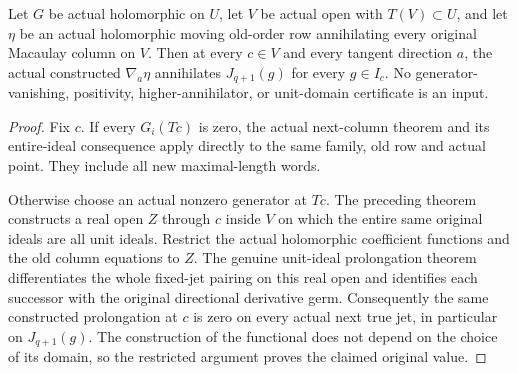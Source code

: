 \begin{theorem}
\label{hir:actual-unconditional-dual-jet-prolongation-whole-original-ideal}
\leanok
Let $G$ be actual holomorphic on $U$, let $V$ be actual open with
$T(V)\subset U$, and let $\eta$ be an actual holomorphic moving
old-order row annihilating every original Macaulay column on $V$.
Then at every $c\in V$ and every tangent direction $a$, the actual
constructed $\nabla_a\eta$ annihilates $J_{q+1}(g)$ for every
$g\in I_c$. No generator-vanishing, positivity, higher-annihilator,
or unit-domain certificate is an input.
\end{theorem}
\begin{proof}
Fix $c$. If every $G_i(Tc)$ is zero, the actual next-column theorem
and its entire-ideal consequence apply directly to the same family,
old row and actual point. They include all new maximal-length words.

Otherwise choose an actual nonzero generator at $Tc$. The preceding
theorem constructs a real open $Z$ through $c$ inside $V$ on which
the entire same original ideals are all unit ideals. Restrict the
actual holomorphic coefficient functions and the old column equations
to $Z$. The genuine unit-ideal prolongation theorem differentiates
the whole fixed-jet pairing on this real open and identifies each
successor with the original directional derivative germ. Consequently
the same constructed prolongation at $c$ is zero on every actual
next true jet, in particular on $J_{q+1}(g)$. The construction of the
functional does not depend on the choice of its domain, so the
restricted argument proves the claimed original value.
\end{proof}

